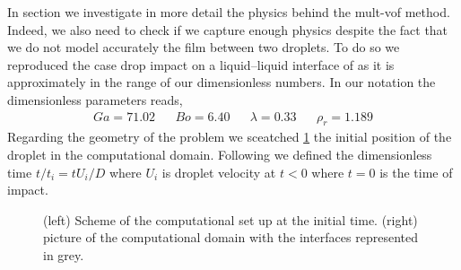 In section we investigate in more detail the physics behind the mult-vof method. 
Indeed, we also need to check if we capture enough physics despite the fact that we do not model accurately  the film between two droplets. 
To do so we reproduced the case drop impact on a liquid–liquid interface of \citet{mohamed2003drop} as it is approximately in the range of our dimensionless numbers. 
In our notation the dimensionless parameters reads, 
\begin{align*}
    Ga = 71.02 
    && Bo = 6.40
    && \lambda = 0.33
    && \rho_r = 1.189
\end{align*}
Regarding the geometry of the problem we sceatched \ref{fig:schemeLong} the initial position of the droplet in the computational domain.
Following \citet{mohamed2003drop} we defined the dimensionless time $t / t_i = t U_i /D$ where $U_i$ is droplet velocity at $t<0$ where $t=0$ is the time of impact. 
\begin{figure}[h!]
    \centering
    \caption{(left) Scheme of the computational set up at the initial time. (right) picture of the computational domain with the interfaces represented in grey.}
    \label{fig:schemeLong}
\end{figure}
